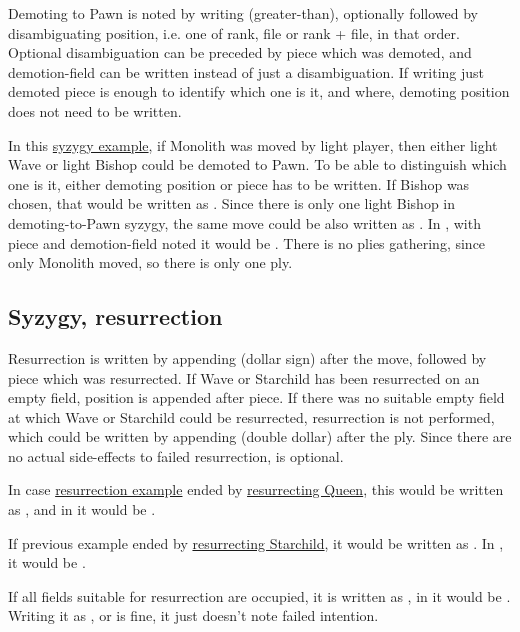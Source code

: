 Demoting to Pawn is noted by writing \alg{>} (greater-than), optionally followed by
disambiguating position, i.e. one of rank, file or rank + file, in that order. Optional
disambiguation can be preceded by piece which was demoted, and demotion-field can be
written instead of just a disambiguation. If writing just demoted piece is enough to
identify which one is it, and where, demoting position does not need to be written.

In this \hyperref[fig:scn_d_19_syzygy_2_stars_init]{syzygy example}, if Monolith was
moved by light player, then either light Wave or light Bishop could be demoted to Pawn.
To be able to distinguish which one is it, either demoting position or piece has to be
written. If Bishop was chosen, that would be written as . Since there is
only one light Bishop in demoting-to-Pawn syzygy, the same move could be also written
as . In , with piece and demotion-field noted it would be
. There is no plies gathering, since only Monolith moved, so there
is only one ply.

\subsection*{Syzygy, resurrection}
\label{sec:Appendix/Notation/Syzygy, resurrection}

Resurrection is written by appending \alg{\$} (dollar sign) after the move, followed by
piece which was resurrected. If Wave or Starchild has been resurrected on an empty field,
position is appended after piece. If there was no suitable empty field at which Wave or
Starchild could be resurrected, resurrection is not performed, which could be written by
appending \alg{\$\$} (double dollar) after the ply. Since there are no actual side-effects
to failed resurrection, \alg{\$\$} is optional.

In case \hyperref[fig:scn_o_32_syzygy_starchild_init]{resurrection example} ended by
\hyperref[fig:scn_o_33_syzygy_starchild_end]{resurrecting Queen}, this would be written
as , and in  it would be .

If previous example ended by
\hyperref[fig:scn_o_34_syzygy_starchild_resurrection]{resurrecting Starchild}, it would
be written as . In , it would be .

If all fields suitable for resurrection are occupied, it is written as , in
 it would be . Writing it as , or  is
fine, it just doesn't note failed intention.


